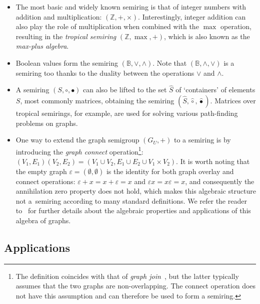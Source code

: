 \documentclass[11pt,letterpaper]{article}
\begin{document}
\begin{itemize}
  \item The most basic and widely known semiring is that of integer numbers with
  addition and multiplication: $(\mathbb{Z}, +, \times)$. Interestingly, integer
  addition can also play the role of multiplication when combined with the
  $\max$ operation, resulting in the \emph{tropical semiring}
  $(\mathbb{Z}, \max, +)$, which is also known as the \emph{max-plus algebra}.

  \item Boolean values form the semiring $(\mathbb{B}, \vee, \wedge)$. Note that
  $(\mathbb{B}, \wedge, \vee)$ is a semiring too thanks to the duality between
  the operations $\vee$ and $\wedge$.

  \item A semiring $(S, \circ, \bullet)$ can also be lifted to the set $\hat{S}$
  of `containers' of elements $S$, most commonly matrices, obtaining the semiring
  $(\hat{S}, \hat{\circ}, \hat{\bullet})$. Matrices over tropical semirings, for
  example, are used for solving various path-finding problems on graphs.

  \item One way to extend the graph semigroup $(G_U,+)$ to a semiring is by
  introducing the \emph{graph connect} operation\footnote{The definition
  coincides with that of \emph{graph join}~\cite{1969_graph_theory_harary}, but
  the latter typically assumes that the two graphs are non-overlapping. The
  connect operation does not have this assumption and can therefore be used to
  form a semiring.}:
  $(V_1, E_1) (V_2, E_2) = (V_1 \cup V_2, E_1 \cup E_2 \cup V_1 \times V_2)$.
  It is worth noting that the empty graph $\varepsilon = (\emptyset, \emptyset)$
  is the identity for both graph overlay and connect operations:
  $\varepsilon + x = x + \varepsilon = x$ and $\varepsilon x = x \varepsilon = x$,
  and consequently the annihilation zero property does not hold, which makes
  this algebraic structure not a~semiring according to many standard definitions.
  We refer the reader to~\cite{mokhov2017algebraic} for further details about the
  algebraic properties and applications of this algebra of graphs.
\end{itemize}


\subsection{Applications}
\end{document}
